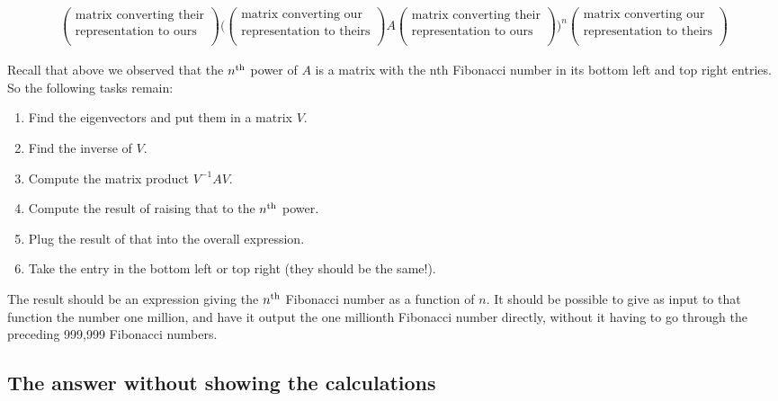\begin{align*}
  \begin{pmatrix}\text{matrix converting their}\\\text{representation to ours} \\ \end{pmatrix}
  \Bigg(
  \begin{pmatrix}\text{matrix converting our}\\\text{representation to theirs} \\ \end{pmatrix}
  A
  \begin{pmatrix}\text{matrix converting their}\\\text{representation to ours} \\ \end{pmatrix}
  \Bigg)^n
  \begin{pmatrix}\text{matrix converting our}\\\text{representation to theirs} \\ \end{pmatrix}
\end{align*}

Recall that above we observed that the $n^{\text{th}}$ power of $A$ is a matrix with the
nth Fibonacci number in its bottom left and top right entries. So the following
tasks remain:
\begin{enumerate}
\item Find the eigenvectors and put them in a matrix $V$.
\item Find the inverse of $V$.
\item Compute the matrix product $V^{-1}AV$.
\item Compute the result of raising that to the $n^{\text{th}}$ power.
\item Plug the result of that into the overall expression.
\item Take the entry in the bottom left or top right (they should be the same!).
\end{enumerate}

The result should be an expression giving the $n^{\text{th}}$ Fibonacci number as a
function of $n$. It should be possible to give as input to that function the
number one million, and have it output the one millionth Fibonacci number
directly, without it having to go through the preceding 999,999 Fibonacci
numbers.


\subsection*{The answer without showing the calculations}

